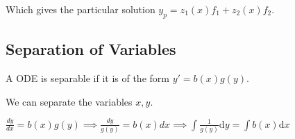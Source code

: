 Which gives the particular solution $y_p = z_1(x) f_1 + z_2(x) f_2$.

\subsection{Separation of Variables}
A ODE is separable if it is of the form $y' = b(x)g(y)$.

We can separate the variables $x, y$.

$\frac{dy}{dx} = b(x)g(y) \implies \frac{dy}{g(y)} = b(x)dx \implies \int \frac{1}{g(y)} \mathrm{d}y = \int b(x)\mathrm{d}x$
